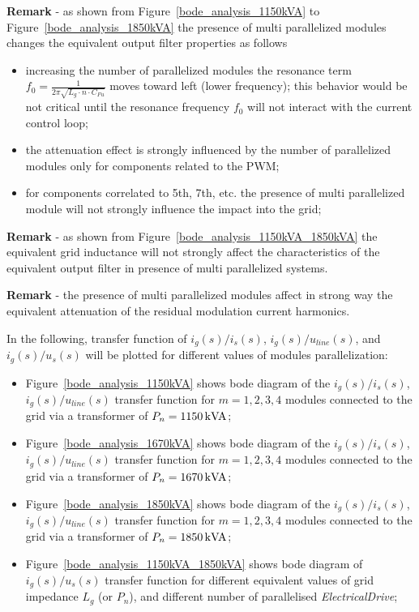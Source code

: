 \documentclass[12pt,a4paper]{scrartcl}
\begin{document}
\begin{onehalfspace}
\noindent\textbf{Remark} - as shown from Figure~\ref{bode_analysis_1150kVA} to Figure~\ref{bode_analysis_1850kVA} the presence of multi parallelized modules changes the equivalent output filter properties as follows
\begin{itemize}
	\item[--] increasing the number of parallelized modules the resonance term $f_0 = \frac{1}{2\pi\sqrt{L_g \cdot n\cdot C_{Fu}}}$ moves toward left (lower frequency); this behavior would be not critical until the resonance frequency $f_0$ will not interact with the current control loop;
	\item[--] the attenuation effect is strongly influenced by the number of parallelized modules only for components related to the PWM;	 
	\item[--] for components correlated to 5th, 7th, etc. the presence of multi parallelized module will not strongly influence the impact into the grid;	 
\end{itemize} 

\noindent\textbf{Remark} - as shown from Figure~\ref{bode_analysis_1150kVA_1850kVA} the equivalent grid inductance will not strongly affect the characteristics of the equivalent output filter in presence of multi parallelized systems.

\noindent\textbf{Remark} - the presence of multi parallelized modules affect in strong way the equivalent attenuation of the residual modulation current harmonics.

In the following, transfer function of ${i_g(s)}/{i_{s}(s)}$, ${i_g(s)}/{u_{line}(s)}$, and ${i_g(s)}/{u_{s}(s)}$ will be plotted for different values of modules parallelization:
\begin{itemize}
	\item[--] Figure~\ref{bode_analysis_1150kVA} shows bode diagram of the ${i_g(s)}/{i_{s}(s)}$, ${i_g(s)}/{u_{line}(s)}$ transfer function for $m=1,2,3,4$ modules connected to the grid via a transformer of $P_n=\SI{1150}{\kilo{\volt\ampere}}$;
	\item[--] Figure~\ref{bode_analysis_1670kVA} shows bode diagram of the ${i_g(s)}/{i_{s}(s)}$, ${i_g(s)}/{u_{line}(s)}$ transfer function for $m=1,2,3,4$ modules connected to the grid via a transformer of $P_n=\SI{1670}{\kilo{\volt\ampere}}$;
	\item[--] Figure~\ref{bode_analysis_1850kVA} shows bode diagram of the ${i_g(s)}/{i_{s}(s)}$, ${i_g(s)}/{u_{line}(s)}$ transfer function for $m=1,2,3,4$ modules connected to the grid via a transformer of $P_n=\SI{1850}{\kilo{\volt\ampere}}$;
	\item[--] Figure~\ref{bode_analysis_1150kVA_1850kVA} shows bode diagram of ${i_g(s)}/{u_{s}(s)}$ transfer function for different equivalent values of grid impedance $L_g$ (or $P_n$), and different number of  parallelised \textit{ElectricalDrive};
\end{itemize}


\end{onehalfspace}
\end{document}

